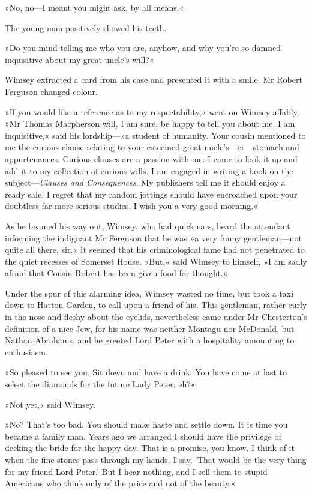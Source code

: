 »No, no—I meant you might ask, by all means.«

The young man positively showed his teeth.

»Do you mind telling me who you are, anyhow, and why you're so damned inquisitive about my great-uncle's will?«

Wimsey extracted a card from his case and presented it with a smile. Mr Robert Ferguson changed colour.

»If you would like a reference as to my respectability,« went on Wimsey affably, »Mr Thomas Macpherson will, I am sure, be happy to tell you about me. I am inquisitive,« said his lordship—»a student of humanity. Your cousin mentioned to me the curious clause relating to your esteemed great-uncle's—er—stomach and appurtenances. Curious clauses are a passion with me. I came to look it up and add it to my collection of curious wills. I am engaged in writing a book on the subject—\textit{Clauses and Consequences}. My publishers tell me it should enjoy a ready sale. I regret that my random jottings should have encroached upon your doubtless far more serious studies. I wish you a very good morning.«

As he beamed his way out, Wimsey, who had quick ears, heard the attendant informing the indignant Mr Ferguson that he was »a very funny gentleman—not quite all there, sir.« It seemed that his criminological fame had not penetrated to the quiet recesses of Somerset House. »But,« said Wimsey to himself, »I am sadly afraid that Cousin Robert has been given food for thought.«

Under the spur of this alarming idea, Wimsey wasted no time, but took a taxi down to Hatton Garden, to call upon a friend of his. This gentleman, rather curly in the nose and fleshy about the eyelids, nevertheless came under Mr Chesterton's definition of a nice Jew, for his name was neither Montagu nor McDonald, but Nathan Abrahams, and he greeted Lord Peter with a hospitality amounting to enthusiasm.

»So pleased to see you. Sit down and have a drink. You have come at last to select the diamonds for the future Lady Peter, eh?«

»Not yet,« said Wimsey.

»No? That's too bad. You should make haste and settle down. It is time you became a family man. Years ago we arranged I should have the privilege of decking the bride for the happy day. That is a promise, you know. I think of it when the fine stones pass through my hands. I say, `That would be the very thing for my friend Lord Peter.' But I hear nothing, and I sell them to stupid Americans who think only of the price and not of the beauty.«

